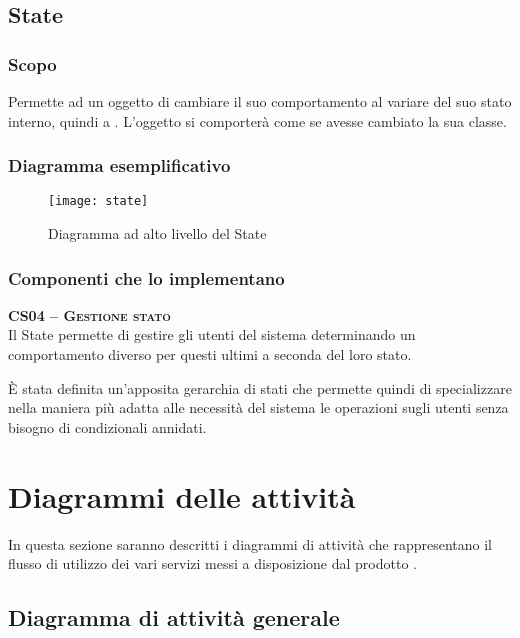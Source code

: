 \subsection{State}

\subsubsection{Scopo}
Permette ad un oggetto di cambiare il suo comportamento al variare del suo stato interno, quindi a . L'oggetto si comporterà come se avesse cambiato la sua classe.

\subsubsection{Diagramma esemplificativo}
\begin{figure}[H]
  \centering
  \texttt{[image: state]}
  \caption{Diagramma ad alto livello del  State}\label{fig:state}
\end{figure}

\subsubsection{Componenti che lo implementano}
\begin{description}
\item{\scshape\bfseries CS04 -- Gestione stato}\\
Il  State permette di gestire gli utenti del sistema determinando un comportamento diverso per questi ultimi a seconda del loro stato.

È stata definita un'apposita gerarchia di stati che permette quindi di specializzare nella maniera più adatta alle necessità del sistema le operazioni sugli utenti senza bisogno di condizionali annidati.
\end{description}
\clearpage

\section{Diagrammi delle attività}
In questa sezione saranno descritti i diagrammi di attività che rappresentano il flusso di utilizzo dei vari servizi messi a disposizione dal prodotto \caName.

\subsection{Diagramma di attività generale}

